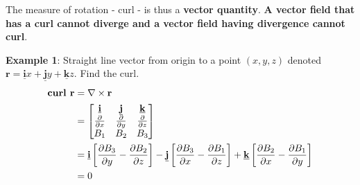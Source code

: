 \documentclass[10pt,a4paper]{article}
\begin{document}
The measure of rotation - curl - is thus a \textbf{vector quantity}. \textbf{A vector field that has a curl cannot diverge and a vector field having divergence cannot curl}.   

\textbf{Example 1}: Straight line vector from origin to a point $(x,y,z)$ denoted
$\textbf{r}=\underline{\textbf{i}}x + \underline{\textbf{j}}y+\underline{\textbf{k}}z$. Find the
curl.
\begin{align*}
    \textbf{curl }\textbf{r} &= \nabla \times \textbf{r} \\
    &= 
    \begin{bmatrix}
        \textbf{\underline{i}} & \textbf{\underline{j}} & \textbf{\underline{k}} \\
        \frac{\partial}{\partial x} & \frac{\partial}{\partial y} & \frac{\partial}{\partial z} \\
        B_1 & B_2 & B_3
    \end{bmatrix} \\
    &= \textbf{\underline{i}}\left[\frac{\partial B_3}{\partial y}-\frac{\partial B_2}{\partial z}\right] - \textbf{\underline{j}}\left[\frac{\partial B_3}{\partial x}-\frac{\partial B_1}{\partial z}\right] + \textbf{\underline{k}}\left[\frac{\partial B_2}{\partial x}-\frac{\partial B_1}{\partial y}\right] \\
    &= 0
\end{align*}
\end{document}
